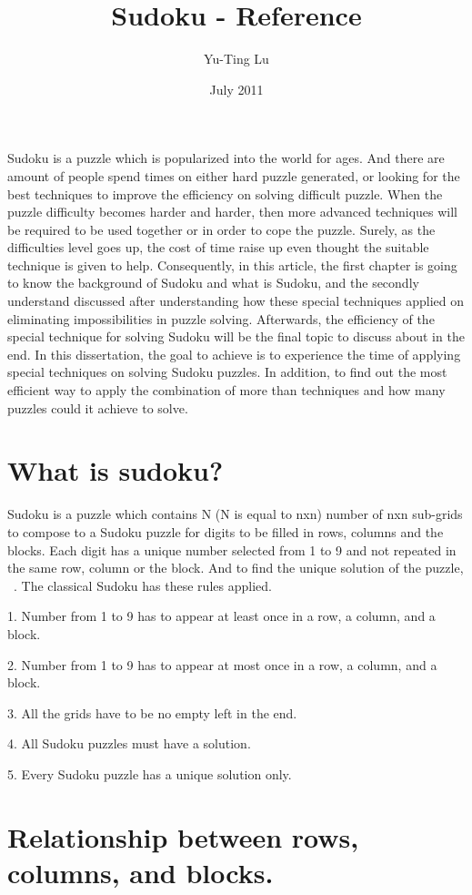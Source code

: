 \documentclass[11pt]{article}
\begin{document}
\title{Sudoku - Reference}
\author{Yu-Ting Lu}
\date{July 2011}
\maketitle

Sudoku is a puzzle which is popularized into the world for ages. And there are amount of people spend times on either hard puzzle generated, or looking for the best techniques to improve the efficiency on solving difficult puzzle.
When the puzzle difficulty becomes harder and harder, then more advanced techniques will be required to be used together or in order to cope the puzzle. Surely, as the difficulties level goes up, the cost of time raise up even thought the suitable technique is given to help. Consequently, in this article, the first chapter is going to know the background of Sudoku and what is Sudoku, and the secondly understand discussed after understanding how these special techniques applied on eliminating impossibilities in puzzle solving. Afterwards, the efficiency of the special technique for solving Sudoku will be the final topic to discuss about in the end.
In this dissertation, the goal to achieve is to experience the time of applying special techniques on solving Sudoku puzzles. In addition, to find out the most efficient way to apply the combination of more than techniques and how many puzzles could it achieve to solve.
\section{What is sudoku?}
Sudoku is a puzzle which contains N (N is equal to nxn) number of nxn sub-grids to compose to a Sudoku puzzle for digits to be filled in rows, columns and the blocks. Each digit has a unique number selected from 1 to 9 and not repeated in the same row, column or the block.
And to find the unique solution of the puzzle,  ~\cite{001}.
The classical Sudoku has these rules applied.

1. Number from 1 to 9 has to appear at least once in a row, a column, and a block.

2. Number from 1 to 9 has to appear at most once in a row, a column, and a block.

3. All the grids have to be no empty left in the end.

4. All Sudoku puzzles must have a solution.

5. Every Sudoku puzzle has a unique solution only.
\section
{Relationship between rows, columns, and blocks.}
\newpage
{}

\end{document}
